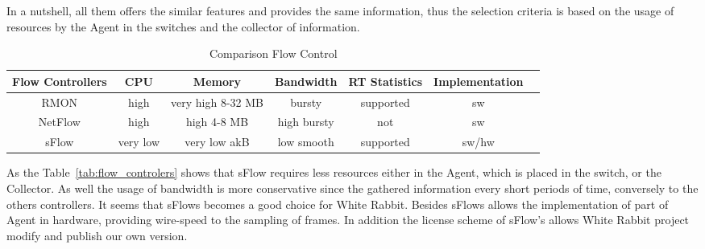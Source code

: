 In a nutshell, all them offers the similar features and provides the same
information, thus the selection criteria is based on the usage of resources by
the Agent in the switches and the collector of information.

\begin{table}[ht]
\begin{center}
    \begin{tabular}{ | c | c | c | c | c | c | c |}
\hline
Flow Controllers & CPU & Memory & Bandwidth & RT Statistics & Implementation \\
\hline
RMON & high &  very high 8-32 MB & bursty & supported & sw \\ \hline
NetFlow & high & high 4-8 MB & high bursty & not & sw  \\ \hline
sFlow & very low & very low akB & low smooth & supported & sw/hw \\ \hline
    \end{tabular}
\end{center}
\caption{Comparison Flow Control}
\end{table}

As the Table~\ref{tab:flow_controlers} shows that sFlow requires less resources
either in the Agent, which is placed in the switch, or the Collector. As well
the usage of bandwidth is more conservative since the gathered information every
short periods of time, conversely to the others controllers. It seems that
sFlows becomes a good choice for White Rabbit. Besides sFlows allows the
implementation of part of Agent in hardware, providing wire-speed to the
sampling of frames. In addition the license scheme of sFlow's  allows White
Rabbit project modify and publish our own version.

